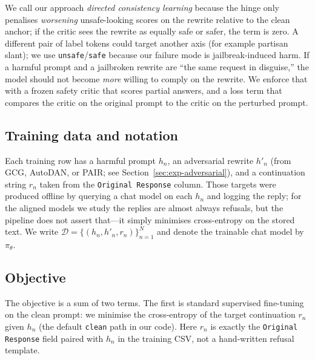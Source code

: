 \documentclass{article}
\begin{document}
We call our approach \emph{directed consistency learning} because the hinge only penalises \emph{worsening} unsafe-looking scores on the rewrite relative to the clean anchor; if the critic sees the rewrite as equally safe or safer, the term is zero. A different pair of label tokens could target another axis (for example partisan slant); we use \texttt{unsafe}/\texttt{safe} because our failure mode is jailbreak-induced harm. If a harmful prompt and a jailbroken rewrite are ``the same request in disguise,'' the model should not become \emph{more} willing to comply on the rewrite. We enforce that with a frozen safety critic that scores partial answers, and a loss term that compares the critic on the original prompt to the critic on the perturbed prompt.

\subsection{Training data and notation}
Each training row has a harmful prompt $h_n$, an adversarial rewrite $h'_n$ (from GCG, AutoDAN, or PAIR; see Section~\ref{sec:exp-adversarial}), and a continuation string $r_n$ taken from the \texttt{Original Response} column. Those targets were produced offline by querying a chat model on each $h_n$ and logging the reply; for the aligned models we study the replies are almost always refusals, but the pipeline does not assert that---it simply minimises cross-entropy on the stored text. We write $\mathcal{D}=\{(h_n,h'_n,r_n)\}_{n=1}^{N}$ and denote the trainable chat model by $\pi_\theta$.

\subsection{Objective}
The objective is a sum of two terms. The first is standard supervised fine-tuning on the clean prompt: we minimise the cross-entropy of the target continuation $r_n$ given $h_n$ (the default \texttt{clean} path in our code). Here $r_n$ is exactly the \texttt{Original Response} field paired with $h_n$ in the training CSV, not a hand-written refusal template.
\end{document}
